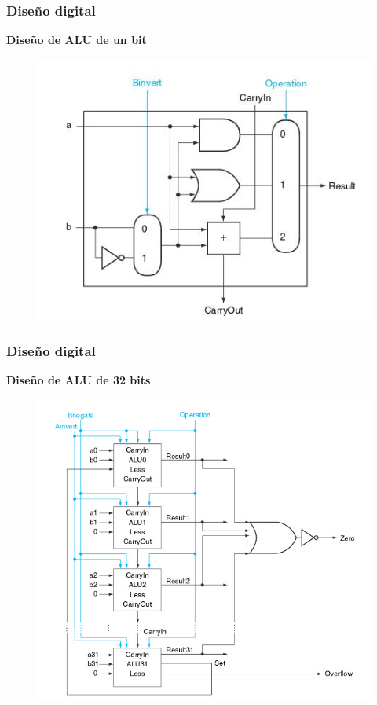 \documentclass[aspectratio=169,compress]{beamer}
\begin{document}
\begin{footnotesize}
\begin{frame}[fragile]
\frametitle{Diseño digital}
\begin{center}\textbf{Diseño de ALU de un bit}\end{center}
\begin{figure}
\includegraphics[scale=0.4]{images/alu1bit-4.jpg} 
\end{figure}
\end{frame}


\begin{frame}[fragile]
\frametitle{Diseño digital}
\begin{center}\textbf{Diseño de ALU de 32 bits}\end{center}
\begin{figure}
\includegraphics[scale=0.4]{images/alu1bit-5.jpg} 
\end{figure}
\end{frame}



\end{footnotesize}
\end{document}
